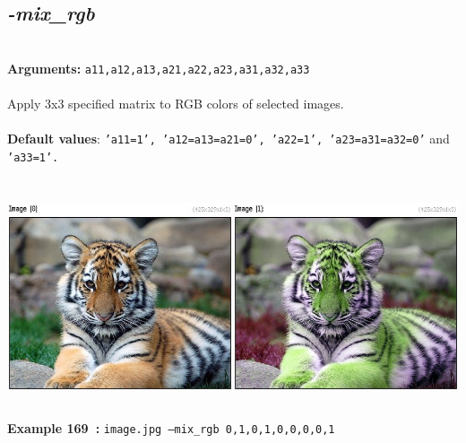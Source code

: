 \documentclass[a4paper,11pt,twoside]{book}
\begin{document}
\subsection{\emph{-mix\_rgb} }\vspace*{-0.5em}
~\\\textbf{Arguments: } 
{\small \texttt{a11,a12,a13,a21,a22,a23,a31,a32,a33}}\\~\\
Apply 3x3 specified matrix to RGB colors of selected images.
~\\~\\\textbf{Default values}: {\small \texttt{'a11=1', 'a12=a13=a21=0', 'a22=1', 'a23=a31=a32=0'} and \texttt{'a33=1'.}}
\begin{center}\includegraphics[keepaspectratio=true,height=7cm,width=\textwidth]{img/gmic_def169.jpg}\\
{\footnotesize \textbf{Example 169~:} \texttt{image.jpg --mix\_rgb 0,1,0,1,0,0,0,0,1}}
\end{center}
\end{document}

